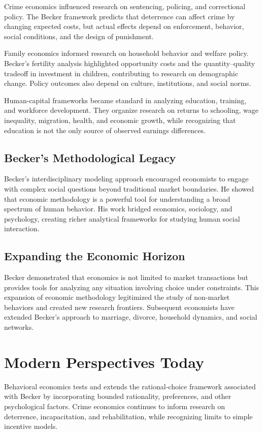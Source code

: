 Crime economics influenced research on sentencing, policing, and correctional
policy. The Becker framework predicts that deterrence can affect crime by
changing expected costs, but actual effects depend on enforcement, behavior,
social conditions, and the design of punishment.

Family economics informed research on household behavior and welfare policy.
Becker's fertility analysis highlighted opportunity costs and the
quantity--quality tradeoff in investment in children, contributing to research
on demographic change. Policy outcomes also depend on culture, institutions,
and social norms.

Human-capital frameworks became standard in analyzing education, training, and
workforce development. They organize research on returns to schooling, wage
inequality, migration, health, and economic growth, while recognizing that
education is not the only source of observed earnings differences.

\subsection*{Becker's Methodological Legacy}
Becker's interdisciplinary modeling approach encouraged economists to engage with
complex social questions beyond traditional market boundaries. He showed that
economic methodology is a powerful tool for understanding a broad spectrum of human
behavior. His work bridged economics, sociology, and psychology, creating richer
analytical frameworks for studying human social interaction.

\subsection*{Expanding the Economic Horizon}
Becker demonstrated that economics is not limited to market transactions but
provides tools for analyzing any situation involving choice under constraints.
This expansion of economic methodology legitimized the study of non-market
behaviors and created new research frontiers. Subsequent economists have extended
Becker's approach to marriage, divorce, household dynamics, and social networks.

\section{Modern Perspectives Today}
Behavioral economics tests and extends the rational-choice framework associated
with Becker by incorporating bounded rationality, preferences, and other
psychological factors. Crime economics continues to inform research on
deterrence, incapacitation, and rehabilitation, while recognizing limits to
simple incentive models.

